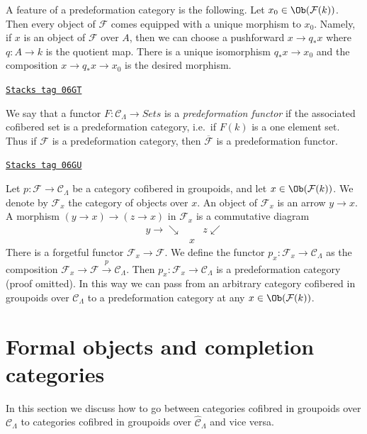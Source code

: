 A feature of a predeformation category is the following.
Let $x_0 \in \Ob(\mathcal{F}(k))$. Then every object of
$\mathcal{F}$ comes equipped with a unique morphism to $x_0$.
Namely, if $x$ is an object of $\mathcal{F}$ over $A$, then we
can choose a pushforward $x \to q_*x$ where $q : A \to k$ is the quotient
map. There is a unique isomorphism $q_*x \to x_0$ and the composition
$x \to q_*x \to x_0$ is the desired morphism.

\begin{remark}
\label{formal-defos-remark-predeformation-functor}
\href{https://stacks.math.columbia.edu/tag/06GT}{\texttt{Stacks tag 06GT}}

We say that a functor $F: \mathcal{C}_\Lambda \to \textit{Sets}$
is a {\it predeformation functor} if the associated cofibered set is a
predeformation category, i.e.\ if $F(k)$ is a one element set.  Thus if
$\mathcal{F}$ is a predeformation category, then $\overline{\mathcal{F}}$ is a
predeformation functor.
\end{remark}

\begin{remark}
\label{formal-defos-remark-localize-cofibered-groupoid}
\href{https://stacks.math.columbia.edu/tag/06GU}{\texttt{Stacks tag 06GU}}

Let $p : \mathcal{F} \to \mathcal{C}_\Lambda$ be a category cofibered in
groupoids, and let $x \in \Ob(\mathcal{F}(k))$.  We denote by
$\mathcal{F}_x$ the category of objects over $x$.
An object of $\mathcal{F}_x$ is an arrow $y \to x$.
A morphism $(y \to x) \to (z \to x)$ in $\mathcal{F}_x$ is a commutative
diagram
$$
\begin{array}{ccc}y \longrightarrow\searrow &  & z \swarrow \\  & x & \end{array}
$$
There is a forgetful functor $\mathcal{F}_x \to \mathcal{F}$. We define
the functor $p_x : \mathcal{F}_x \to \mathcal{C}_\Lambda$ as the
composition
$\mathcal{F}_x \to \mathcal{F} \xrightarrow{p} \mathcal{C}_\Lambda$.
Then $p_x : \mathcal{F}_x \to \mathcal{C}_\Lambda$ is a
predeformation category (proof omitted). In this way we can pass from an
arbitrary category cofibered in groupoids over $\mathcal{C}_\Lambda$
to a predeformation category at any $x \in \Ob(\mathcal{F}(k))$.
\end{remark}

\section{Formal objects and completion categories}
\label{formal-defos-section-formal-objects}
In this section we discuss how to go between categories cofibred in
groupoids over $\mathcal{C}_\Lambda$ to categories cofibred in
groupoids over $\widehat{\mathcal{C}}_\Lambda$ and vice versa.

